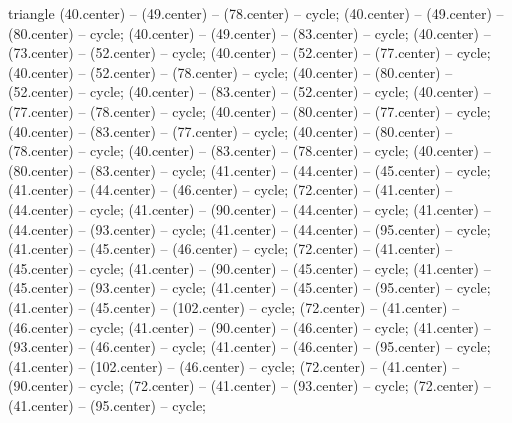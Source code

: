 {\begin{pgfonlayer}{triangle}
 (40.center) -- (49.center) -- (78.center) -- cycle; 
 (40.center) -- (49.center) -- (80.center) -- cycle; 
 (40.center) -- (49.center) -- (83.center) -- cycle; 
 (40.center) -- (73.center) -- (52.center) -- cycle; 
 (40.center) -- (52.center) -- (77.center) -- cycle; 
 (40.center) -- (52.center) -- (78.center) -- cycle; 
 (40.center) -- (80.center) -- (52.center) -- cycle; 
 (40.center) -- (83.center) -- (52.center) -- cycle; 
 (40.center) -- (77.center) -- (78.center) -- cycle; 
 (40.center) -- (80.center) -- (77.center) -- cycle; 
 (40.center) -- (83.center) -- (77.center) -- cycle; 
 (40.center) -- (80.center) -- (78.center) -- cycle; 
 (40.center) -- (83.center) -- (78.center) -- cycle; 
 (40.center) -- (80.center) -- (83.center) -- cycle; 
 (41.center) -- (44.center) -- (45.center) -- cycle; 
 (41.center) -- (44.center) -- (46.center) -- cycle; 
 (72.center) -- (41.center) -- (44.center) -- cycle; 
 (41.center) -- (90.center) -- (44.center) -- cycle; 
 (41.center) -- (44.center) -- (93.center) -- cycle; 
 (41.center) -- (44.center) -- (95.center) -- cycle; 
 (41.center) -- (45.center) -- (46.center) -- cycle; 
 (72.center) -- (41.center) -- (45.center) -- cycle; 
 (41.center) -- (90.center) -- (45.center) -- cycle; 
 (41.center) -- (45.center) -- (93.center) -- cycle; 
 (41.center) -- (45.center) -- (95.center) -- cycle; 
 (41.center) -- (45.center) -- (102.center) -- cycle; 
 (72.center) -- (41.center) -- (46.center) -- cycle; 
 (41.center) -- (90.center) -- (46.center) -- cycle; 
 (41.center) -- (93.center) -- (46.center) -- cycle; 
 (41.center) -- (46.center) -- (95.center) -- cycle; 
 (41.center) -- (102.center) -- (46.center) -- cycle; 
 (72.center) -- (41.center) -- (90.center) -- cycle; 
 (72.center) -- (41.center) -- (93.center) -- cycle; 
 (72.center) -- (41.center) -- (95.center) -- cycle; 

\end{pgfonlayer}}
